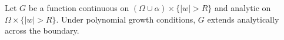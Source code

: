 
Let $G$ be a function continuous on $(\Omega \cup \alpha) \times \{|w| > R\}$ and analytic on $\Omega \times \{|w| > R\}$. Under polynomial growth conditions, $G$ extends analytically across the boundary.
